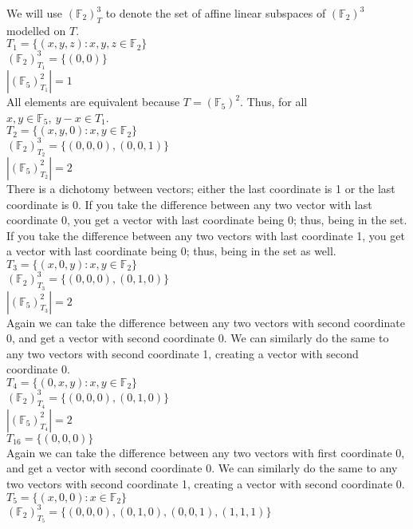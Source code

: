 \documentclass[11pt]{article}
\begin{document}
\begin{flushleft}
We will use $(\mathbb{F}_2)^3_T$ to denote the set of affine linear subspaces of $(\mathbb{F}_2)^3$ modelled on $T$. \\
\bigskip
$T_1 = \{ (x,y,z): x,y,z \in \mathbb{F}_2 \}$ \\
$(\mathbb{F}_2)^3_{T_1} = \{ (0,0) \}$ \\
$|(\mathbb{F}_5)^2_{T_1}| = 1$ \\
All elements are equivalent because $T = (\mathbb{F}_5)^2$. Thus, for all $x,y \in \mathbb{F}_5, \ y -x \in T_1$. \\
\bigskip
$T_2 = \{ (x,y,0): x,y \in \mathbb{F}_2 \}$ \\
$(\mathbb{F}_2)^3_{T_2} = \{ (0,0,0), (0,0,1) \}$ \\
$|(\mathbb{F}_5)^2_{T_2}| = 2$ \\
There is a dichotomy between vectors; either the last coordinate is 1 or the last coordinate is 0. If you take the difference between any two vector with last coordinate 0, you get a vector with last coordinate being 0; thus, being in the set. If you take the difference between any two vectors with last coordinate 1, you get a vector with last coordinate being 0; thus, being in the set as well. \\
\bigskip
$T_3 = \{ (x,0,y): x,y \in \mathbb{F}_2 \}$ \\
$(\mathbb{F}_2)^3_{T_3} = \{ (0,0,0), (0,1,0) \}$ \\
$|(\mathbb{F}_5)^2_{T_3}| = 2$ \\
Again we can take the difference between any two vectors with second coordinate 0, and get a vector with second coordinate 0. We can similarly do the same to any two vectors with second coordinate 1, creating a vector with second coordinate 0. \\
\bigskip
$T_4 = \{ (0,x,y): x,y \in \mathbb{F}_2 \}$ \\
$(\mathbb{F}_2)^3_{T_4} = \{ (0,0,0), (0,1,0) \}$ \\
$|(\mathbb{F}_5)^2_{T_4}| = 2$ \\$T_16 = \{ (0,0,0) \}$ \\
Again we can take the difference between any two vectors with first coordinate 0, and get a vector with second coordinate 0. We can similarly do the same to any two vectors with second coordinate 1, creating a vector with second coordinate 0. \\
\bigskip
$T_5 = \{ (x,0,0): x \in \mathbb{F}_2 \}$ \\
$(\mathbb{F}_2)^3_{T_5} = \{ (0,0,0), (0,1,0), (0,0,1), (1,1,1) \}$ \\

\end{flushleft}
\end{document}
